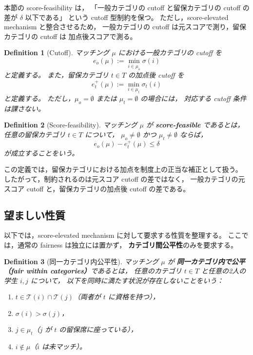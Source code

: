 \documentclass[
  12pt,
  a4paper,
  oneside,
  onecolumn,
  titlepage,
  final
]{jsarticle}
\newtheorem{definition}{Definition}
\newcommand{\1}{\mathbf{1}}
\begin{document}
本節の score-feasibility は，
「一般カテゴリの cutoff と留保カテゴリの cutoff の差が $\delta$ 以下である」
という cutoff 型制約を保つ。
ただし，score-elevated mechanism と整合させるため，
一般カテゴリの cutoff は元スコアで測り，留保カテゴリの cutoff は
加点後スコアで測る。

\begin{definition}[Cutoff]
\label{def:adjusted-cutoff}
マッチング $\mu$ における一般カテゴリの cutoff を
\[
    e_o(\mu):=\min_{i\in\mu_o}\sigma(i)
\]
と定義する。
また，留保カテゴリ $t\in T$ の加点後 cutoff を
\[
    e_t^+(\mu):=\min_{i\in\mu_t}\sigma_t(i)
\]
と定義する。
ただし，$\mu_o=\emptyset$ または $\mu_t=\emptyset$ の場合には，
対応する cutoff 条件は課さない。
\end{definition}

\begin{definition}[Score-feasibility]
\label{def:score-feasibility-adjusted-cutoff}
マッチング $\mu$ が \textbf{score-feasible} であるとは，
任意の留保カテゴリ $t\in T$ について，
$\mu_o\neq\emptyset$ かつ $\mu_t\neq\emptyset$ ならば，
\[
    e_o(\mu)-e_t^+(\mu)\leq \delta
\]
が成立することをいう。
\end{definition}

\noindent
この定義では，留保カテゴリにおける加点を制度上の正当な補正として扱う。
したがって，制約されるのは元スコア cutoff の差ではなく，
一般カテゴリの元スコア cutoff と，留保カテゴリの加点後 cutoff の差である。

\subsection{望ましい性質}

以下では，score-elevated mechanism に対して要求する性質を整理する。
ここでは，通常の fairness は独立には置かず，
\textbf{カテゴリ間公平性}のみを要求する。

\begin{definition}[同一カテゴリ内公平性]
\label{def:within-cat-final}
マッチング $\mu$ が
\textbf{同一カテゴリ内で公平（fair within categories）}であるとは，
任意のカテゴリ $t \in T$ と任意の2人の学生 $i, j$ について，
以下を同時に満たす状況が存在しないことをいう：
\begin{enumerate}
    \item $t \in \mathcal{T}(i) \cap \mathcal{T}(j)$（両者が $t$ に資格を持つ），
    \item $\sigma(i) > \sigma(j)$，
    \item $j \in \mu_t$（$j$ が $t$ の留保席に座っている），
    \item $i \notin \mu$（$i$ は未マッチ）。
\end{enumerate}
\end{definition}
\end{document}
